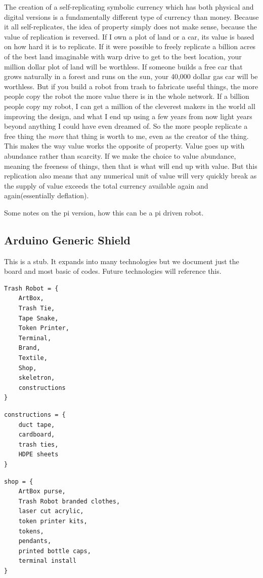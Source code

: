 The creation of a self-replicating symbolic currency which has both physical and digital versions is a fundamentally different type of currency than money.  Because it all self-replicates, the idea of property simply does not make sense, because the value of replication is reversed.  If I own a plot of land or a car, its value is based on how hard it is to replicate.  If it were possible to freely replicate a billion acres of the best land imaginable with warp drive to get to the best location, your million dollar plot of land will be worthless.  If someone builds a free car that grows naturally in a forest and runs on the sun, your 40,000 dollar gas car will be worthless.  But if you build a robot from trash to fabricate useful things, the more people copy the robot the more value there is in the whole network. If a billion people copy my robot, I can get a million of the cleverest makers in the world all improving the design, and what I end up using a few years from now light years beyond anything I could have even dreamed of.  So the more people replicate a free thing the \emph{more} that thing is worth to me, even as the creator of the thing.  This makes the way value works the opposite of property.  Value goes up with abundance rather than scarcity.  If we make the choice to value abundance, meaning the freeness of things, then that is what will end up with value.  But this replication also means that any numerical unit of value will very quickly break as the supply of value exceeds the total currency available again and again(essentially deflation).  

Some notes on the pi version, how this can be a pi driven robot.



\subsection{Arduino Generic Shield}

This is a stub.  It expands into many technologies but we document just the board and most basic of codes.  Future technologies will reference this.

\begin{verbatim}
Trash Robot = {
    ArtBox,
    Trash Tie,
    Tape Snake,
    Token Printer,
    Terminal,
    Brand,
    Textile,
    Shop,
    skeletron,
    constructions
}
\end{verbatim}
    
\begin{verbatim}
constructions = {
    duct tape, 
    cardboard, 
    trash ties, 
    HDPE sheets
}
\end{verbatim}
\begin{verbatim}
shop = {
    ArtBox purse, 
    Trash Robot branded clothes, 
    laser cut acrylic, 
    token printer kits,
    tokens,
    pendants,
    printed bottle caps,
    terminal install
}
\end{verbatim}

